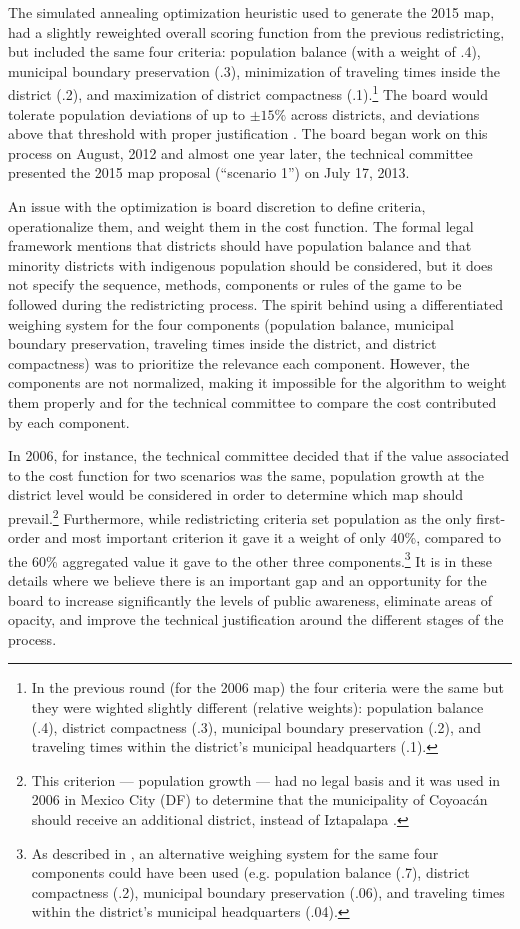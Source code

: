 \documentclass[letter,12pt]{article}
\begin{document}
The simulated annealing optimization heuristic  used to generate the 2015 map, had a slightly reweighted overall scoring function from the previous redistricting, but included the same four criteria: population balance (with a weight of .4), municipal boundary preservation (.3), minimization of traveling times inside the district (.2), and maximization of district compactness (.1).\footnote{In the previous round (for the 2006 map) the four criteria were the same but they were wighted slightly different (relative weights): population balance (.4), district compactness (.3), municipal boundary preservation (.2), and traveling times within the district's municipal headquarters (.1).} The board would tolerate population deviations of up to $\pm 15\%$ across districts, and deviations above that threshold with proper justification \citep{acuerdo.ife.2013}. The board began work on this process on August, 2012 and almost one year later, the technical committee presented the 2015 map proposal (``scenario 1'') on July 17, 2013. 

An issue with the optimization is board discretion to define criteria, operationalize them, and weight them in the cost function. The formal legal framework mentions that districts should have population balance and that minority districts with indigenous population should be considered, but it does not specify the sequence, methods, components or rules of the game to be followed during the redistricting process. The spirit behind using a differentiated weighing system for the four components (population balance, municipal boundary preservation, traveling times inside the district, and district compactness) was to prioritize the relevance each component. However, the components are not normalized, making it impossible for the algorithm to weight them properly and for the technical committee to compare the cost contributed by each component.

In 2006, for instance, the technical committee decided that if the value associated to the cost function for two scenarios was the same, population growth at the district level would be considered in order to determine which map should prevail.\footnote{This criterion --- population growth --- had no legal basis and it was used in 2006 in Mexico City (DF) to determine that the municipality of Coyoac\'an should receive an additional district, instead of Iztapalapa \citep{memorias.ife.2005}.}  Furthermore, while redistricting criteria \citep{acuerdo.ife.2004,acuerdo.ife.2013} set population as the only first-order and most important criterion it gave it a weight of only 40\%, compared to the 60\% aggregated value it gave to the other three components.\footnote{As described in \citep{trelles.mtz.tesisItam.2007}, an alternative weighing system for the same four components could have been used (e.g. population balance (.7), district compactness (.2), municipal boundary preservation (.06), and traveling times within the district's municipal headquarters (.04).}  It is in these details where we believe there is an important gap and an opportunity for the board to increase significantly the levels of public awareness, eliminate areas of opacity, and improve the technical justification around the different stages of the process.
\end{document}
